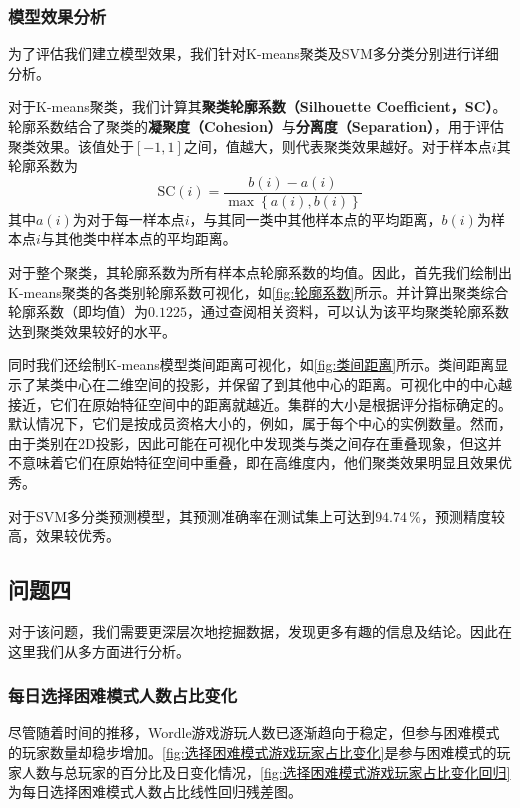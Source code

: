 \documentclass{MathModeling}
\begin{document}
	\subsubsection{模型效果分析}
	为了评估我们建立模型效果，我们针对K-means聚类及SVM多分类分别进行详细分析。
	
	对于K-means聚类，我们计算其\textbf{聚类轮廓系数（Silhouette Coefficient，SC）}。轮廓系数结合了聚类的\textbf{凝聚度（Cohesion）}与\textbf{分离度（Separation）}，用于评估聚类效果。该值处于$\left[-1,1\right]$之间，值越大，则代表聚类效果越好。对于样本点$i$其轮廓系数为
	\begin{equation}
		\text{SC}\left(i\right)=\frac{b\left(i\right)-a\left(i\right)}{\max\left\{a\left(i\right),b\left(i\right)\right\}}
	\end{equation}
	其中$a\left(i\right)$为对于每一样本点$i$，与其同一类中其他样本点的平均距离，$b\left(i\right)$为样本点$i$与其他类中样本点的平均距离。
	
	对于整个聚类，其轮廓系数为所有样本点轮廓系数的均值。因此，首先我们绘制出K-means聚类的各类别轮廓系数可视化，如\textcolor{blue}{\cref{fig:轮廓系数}}所示。并计算出聚类综合轮廓系数（即均值）为$0.1225$，通过查阅相关资料\textcolor{blue}{\cite{k-means}}，可以认为该平均聚类轮廓系数达到聚类效果较好的水平。

	同时我们还绘制K-means模型类间距离可视化，如\textcolor{blue}{\cref{fig:类间距离}}所示。类间距离显示了某类中心在二维空间的投影，并保留了到其他中心的距离。可视化中的中心越接近，它们在原始特征空间中的距离就越近。集群的大小是根据评分指标确定的。默认情况下，它们是按成员资格大小的，例如，属于每个中心的实例数量\textcolor{blue}{\cite{类间距离}}。然而，由于类别在2D投影，因此可能在可视化中发现类与类之间存在重叠现象，但这并不意味着它们在原始特征空间中重叠，即在高维度内，他们聚类效果明显且效果优秀。

	对于SVM多分类预测模型，其预测准确率在测试集上可达到$94.74\,\%$，预测精度较高，效果较优秀。
	\subsection{问题四}\label{问题四}
	对于该问题，我们需要更深层次地挖掘数据，发现更多有趣的信息及结论。因此在这里我们从多方面进行分析。
	\subsubsection{每日选择困难模式人数占比变化}
	尽管随着时间的推移，Wordle游戏游玩人数已逐渐趋向于稳定，但参与困难模式的玩家数量却稳步增加。\textcolor{blue}{\cref{fig:选择困难模式游戏玩家占比变化}}是参与困难模式的玩家人数与总玩家的百分比及日变化情况，\textcolor{blue}{\cref{fig:选择困难模式游戏玩家占比变化回归}}为每日选择困难模式人数占比线性回归残差图。
\end{document}
